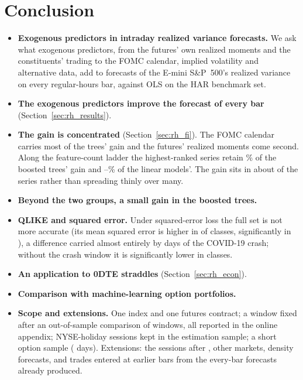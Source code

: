 

\section{Conclusion}
\label{sec:rh_conclusion}
\begin{itemize}
\item \textbf{Exogenous predictors in intraday realized variance forecasts.} We ask what exogenous predictors, from
  the futures' own realized moments and the constituents' trading to the FOMC calendar, implied volatility and
  alternative data, add to forecasts of the E-mini S\&P~500's realized variance on every regular-hours bar,
  against OLS on the HAR benchmark set.
\item \textbf{The exogenous predictors improve the forecast of every bar} (Section~\ref{sec:rh_results}).
\item \textbf{The gain is concentrated} (Section~\ref{sec:rh_fi}). The FOMC calendar
  carries most of the trees' gain and the futures' realized moments come second. Along the feature-count ladder the
  \ladderEBTopK{} highest-ranked series retain \ladderEBTreeRetainRng{}\% of the boosted trees' gain and
  \rhldEBLinRTenMin{}--\rhldEBLinRTenMax{}\% of the linear models'. The gain sits in about \ladderEBTopK{} of the
  \rhldEBNSeries{} series rather than spreading thinly over many.
\item \textbf{Beyond the two groups, a small gain in the boosted trees.}
\item \textbf{QLIKE and squared error.} Under squared-error loss the full set is not more accurate (its mean squared
  error is higher in \rhcaNMseHigherBarSpan{} of \rhorAfPairs{} classes, significantly in \rhcaNMseHigherSigBarSpan),
  a difference carried almost entirely by \rhcaTopDays{} days of the COVID-19 crash; without the crash window it is
  significantly lower in \rhcaNMseLowerSigBarOosExCrash{} classes.
\item \textbf{An application to 0DTE straddles} (Section~\ref{sec:rh_econ}).
\item \textbf{Comparison with machine-learning option portfolios.}
\item \textbf{Scope and extensions.} One index and one futures contract; a window fixed after an out-of-sample
  comparison of windows, all reported in the online appendix; NYSE-holiday sessions kept in the estimation sample; a
  short option sample (\rheSzDays{} days). Extensions: the sessions after \rhorSpanEnd, other markets, density
  forecasts, and trades entered at earlier bars from the every-bar forecasts already produced.
\end{itemize}


